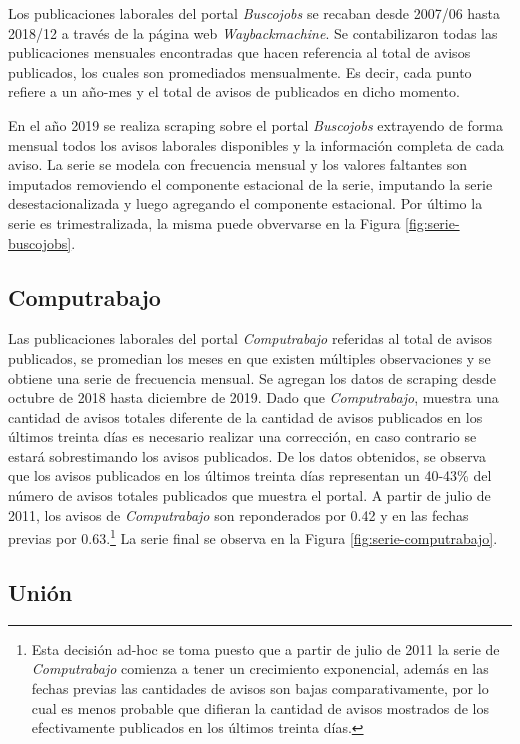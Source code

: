 \documentclass[12pt,oneside]{reedthesis}
\begin{document}
Los publicaciones laborales del portal \emph{Buscojobs} se recaban desde 2007/06 hasta 2018/12 a través de la página web \emph{Waybackmachine}. Se contabilizaron todas las publicaciones mensuales encontradas que hacen referencia al total de avisos publicados, los cuales son promediados mensualmente. Es decir, cada punto refiere a un año-mes y el total de avisos de publicados en dicho momento.

En el año 2019 se realiza scraping sobre el portal \emph{Buscojobs} extrayendo de forma mensual todos los avisos laborales disponibles y la información completa de cada aviso. La serie se modela con frecuencia mensual y los valores faltantes son imputados removiendo el componente estacional de la serie, imputando la serie desestacionalizada y luego agregando el componente estacional. Por último la serie es trimestralizada, la misma puede obvervarse en la Figura \ref{fig:serie-buscojobs}.

\hypertarget{computrabajo}{%
\subsection{Computrabajo}\label{computrabajo}}

Las publicaciones laborales del portal \emph{Computrabajo} referidas al total de avisos publicados, se promedian los meses en que existen múltiples observaciones y se obtiene una serie de frecuencia mensual. Se agregan los datos de scraping desde octubre de 2018 hasta diciembre de 2019. Dado que \emph{Computrabajo}, muestra una cantidad de avisos totales diferente de la cantidad de avisos publicados en los últimos treinta días es necesario realizar una corrección, en caso contrario se estará sobrestimando los avisos publicados. De los datos obtenidos, se observa que los avisos publicados en los últimos treinta días representan un 40-43\% del número de avisos totales publicados que muestra el portal. A partir de julio de 2011, los avisos de \emph{Computrabajo} son reponderados por 0.42 y en las fechas previas por 0.63.\footnote{Esta decisión ad-hoc se toma puesto que a partir de julio de 2011 la serie de \emph{Computrabajo} comienza a tener un crecimiento exponencial, además en las fechas previas las cantidades de avisos son bajas comparativamente, por lo cual es menos probable que difieran la cantidad de avisos mostrados de los efectivamente publicados en los últimos treinta días.} La serie final se observa en la Figura \ref{fig:serie-computrabajo}.

\hypertarget{uniuxf3n}{%
\subsection{Unión}\label{uniuxf3n}}
\end{document}
